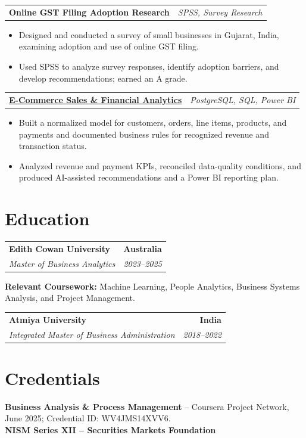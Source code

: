 \documentclass[letterpaper,10pt]{article}
\makeatletter
\newcommand{\role}[4]{%
  \begin{tabularx}{\textwidth}{@{}Xr@{}}
    \textbf{#1} & \textbf{#2} \\
    \textit{#3} & \textit{#4}
  \end{tabularx}\vspace{-1pt}
}
\newcommand{\project}[2]{%
  \begin{tabularx}{\textwidth}{@{}Xr@{}}
    \textbf{#1} & \textit{#2}
  \end{tabularx}\vspace{-1pt}
}
\makeatother
\begin{document}
\project{Online GST Filing Adoption Research}{SPSS, Survey Research}
\begin{itemize}
  \item Designed and conducted a survey of small businesses in Gujarat, India, examining adoption and use of online GST filing.
  \item Used SPSS to analyze survey responses, identify adoption barriers, and develop recommendations; earned an A grade.
\end{itemize}
\vspace{1pt}

\project{\href{https://github.com/jainalimehta/Ecommerce-Sales-Analytics}{E-Commerce Sales \& Financial Analytics}}{PostgreSQL, SQL, Power BI}
\begin{itemize}
  \item Built a normalized model for customers, orders, line items, products, and payments and documented business rules for recognized revenue and transaction status.
  \item Analyzed revenue and payment KPIs, reconciled data-quality conditions, and produced AI-assisted recommendations and a Power BI reporting plan.
\end{itemize}

\section{Education}
\role{Edith Cowan University}{Australia}{Master of Business Analytics}{2023--2025}
\small\textbf{Relevant Coursework:} Machine Learning, People Analytics, Business Systems Analysis, and Project Management.\\[2pt]
\role{Atmiya University}{India}{Integrated Master of Business Administration}{2018--2022}

\section{Credentials}
\small\textbf{Business Analysis \& Process Management} -- Coursera Project Network, June 2025; Credential ID: WV4JMS14XVV6.\\[-0.2pt]
\small\textbf{NISM Series XII -- Securities Markets Foundation}
\end{document}
